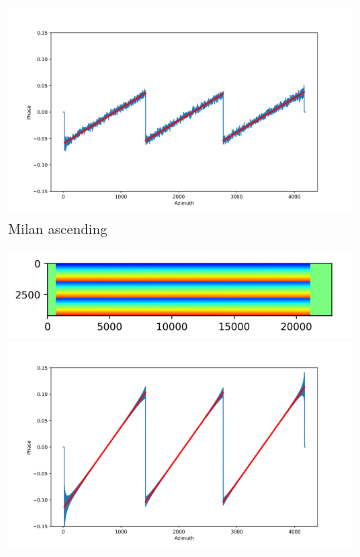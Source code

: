 \documentclass[a4paper,fleqn]{cas-sc}
\begin{document}
\begin{figure}
\begin{subfigure}{0.5\textwidth}
\begin{minipage}{0.5\textwidth}
            \centering
            \includegraphics[width=\textwidth]{figure/The cross-interferogram/cross_interf_Milan_asc_row&fitted_20230104.png}
        \end{minipage}
        \caption{Milan ascending}
        \label{fig_5f}
    \end{subfigure}%
    \begin{subfigure}{0.5\textwidth}
        \centering
        \begin{minipage}{0.5\textwidth}
            \centering
            \includegraphics[width=\textwidth]{figure/The cross-interferogram/cross_interf_Milan_des.png}
        \end{minipage}%
        \begin{minipage}{0.5\textwidth}
            \centering
            \includegraphics[width=\textwidth]{figure/The cross-interferogram/cross_interf_Milan_des_row&fitted_20230108.png}

\end{minipage}
\end{subfigure}
\end{figure}
\end{document}
